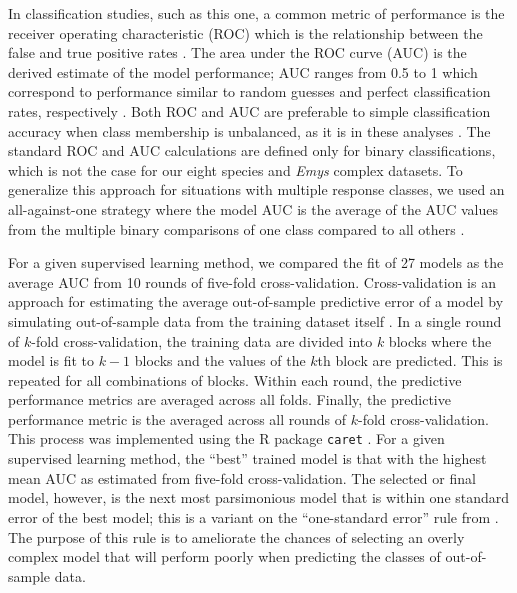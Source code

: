 \documentclass[fleqn,10pt,lineno]{wlpeerj} %
\begin{document}
In classification studies, such as this one, a common metric of performance is the receiver operating characteristic (ROC) which is the relationship between the false and true positive rates \citep{Hastie2009}. The area under the ROC curve (AUC) is the derived estimate of the model performance; AUC ranges from 0.5 to 1 which correspond to performance similar to random guesses and perfect classification rates, respectively \citep{Hastie2009}. Both ROC and AUC are preferable to simple classification accuracy when class membership is unbalanced, as it is in these analyses \citep{Hastie2009}. The standard ROC and AUC calculations are defined only for binary classifications, which is not the case for our eight species and \textit{Emys} complex datasets. To generalize this approach for situations with multiple response classes, we used an all-against-one strategy where the model AUC is the average of the AUC values from the multiple binary comparisons of one class compared to all others \citep{Hand2001}. 

For a given supervised learning method, we compared the fit of 27 models as the average AUC from 10 rounds of five-fold cross-validation. Cross-validation is an approach for estimating the average out-of-sample predictive error of a model by simulating out-of-sample data from the training dataset itself \citep{Hastie2009}. In a single round of \(k\)-fold cross-validation, the training data are divided into \(k\) blocks where the model is fit to \(k - 1\) blocks and the values of the \(k\)th block are predicted. This is repeated for all combinations of blocks. Within each round, the predictive performance metrics are averaged across all folds. Finally, the predictive performance metric is the averaged across all rounds of \(k\)-fold cross-validation. This process was implemented using the R package \texttt{caret} \citep{KuhnMAN2013}. For a given supervised learning method, the ``best'' trained model is that with the highest mean AUC as estimated from five-fold cross-validation. The selected or final model, however, is the next most parsimonious model that is within one standard error of the best model; this is a variant on the ``one-standard error'' rule from \citet{Hastie2009}. The purpose of this rule is to ameliorate the chances of selecting an overly complex model that will perform poorly when predicting the classes of out-of-sample data.
\end{document}
